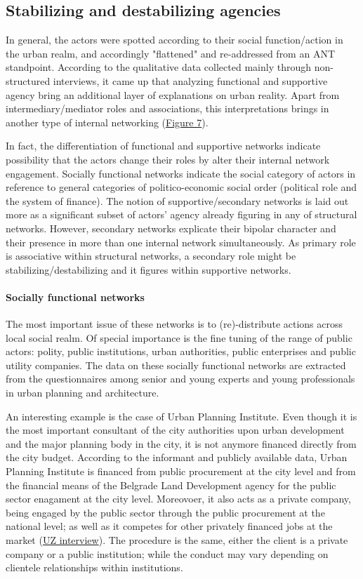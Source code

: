 \documentclass[11pt]{report}
\begin{document}
\subsection{Stabilizing and destabilizing agencies}

In general, the actors were spotted according to their social function/action in the urban realm, and accordingly "flattened" and re-addressed from an ANT standpoint.
According to the qualitative data collected mainly through non-structured interviews, it came up that analyzing functional and supportive agency bring an additional layer of explanations on urban reality.
Apart from intermediary/mediator roles and associations, this interpretations brings in another type of internal networking (\href{}{Figure 7}).

In fact, the differentiation of functional and supportive networks indicate possibility that the actors change their roles by alter their internal network engagement.
Socially functional networks indicate the social category of actors in reference to general categories of politico-economic social order (political role and the system of finance).
The notion of supportive/secondary networks is laid out more as a significant subset of actors' agency already figuring in any of structural networks.
However, secondary networks explicate their bipolar character and their presence in more than one internal network simultaneously.
As primary role is associative within structural networks, a secondary role might be stabilizing/destabilizing and it figures within supportive networks. 

\paragraph{Socially functional networks}

The most important issue of these networks is to (re)-distribute actions across local social realm.
Of special importance is the fine tuning of the range of public actors: polity, public institutions, urban authorities, public enterprises and public utility companies.
The data on these socially functional networks are extracted from the questionnaires among senior and young experts and young professionals in urban planning and architecture. 

An interesting example is the case of Urban Planning Institute. Even though it is the most important consultant of the city authorities upon urban development and the major planning body in the city, it is not anymore financed directly from the city budget.
According to the informant and publicly available data, Urban Planning Institute is financed from public procurement at the city level and from the financial means of the Belgrade Land Development agency for the public sector enagament at the city level.
Moreovoer, it also acts as a private company, being engaged by the public sector through the public procurement at the national level; as well as it competes for other privately financed jobs at the market (\href{}{UZ interview}).
The procedure is the same, either the client is a private company or a public institution; while the conduct may vary depending on clientele relationships within institutions.
\end{document}
